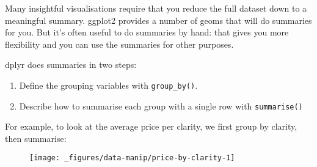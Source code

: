 Many insightful visualisations require that you reduce the full dataset
down to a meaningful summary. ggplot2 provides a number of geoms that
will do summaries for you. But it's often useful to do summaries by
hand: that gives you more flexibility and you can use the summaries for
other purposes.  

dplyr does summaries in two steps:

\begin{enumerate}
\def\labelenumi{\arabic{enumi}.}
\tightlist
\item
  Define the grouping variables with \texttt{group\_by()}.
\item
  Describe how to summarise each group with a single row with
  \texttt{summarise()}
\end{enumerate}

For example, to look at the average price per clarity, we first group by
clarity, then summarise:

\begin{Shaded}
\begin{Highlighting}[]
\StringTok{ }
\StringTok{ } 
\CommentTok{#> }

\StringTok{ }
\StringTok{  }\NormalTok{(}\NormalTok{(} \NormalTok{), } \NormalTok{) +}
\StringTok{  }\NormalTok{(} \NormalTok{)}
\end{Highlighting}
\end{Shaded}

\begin{figure}[H]
  \centering
  \texttt{[image: \_figures/data-manip/price-by-clarity-1]}
\end{figure}

